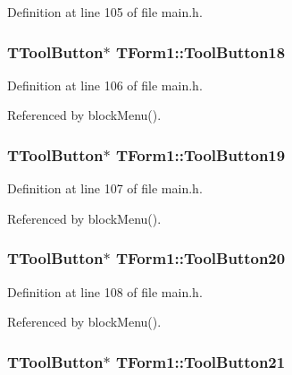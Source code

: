 Definition at line 105 of file main.h.\hypertarget{classTForm1_6459f873cefb4680462772e31df931c4}{
\subsubsection[ToolButton18]{\setlength{\rightskip}{0pt plus 5cm}TToolButton$\ast$ {\bf TForm1::ToolButton18}}}
\label{classTForm1_6459f873cefb4680462772e31df931c4}




Definition at line 106 of file main.h.

Referenced by blockMenu().\hypertarget{classTForm1_88347ab66f85c36c884738d8ee5e58a3}{
\subsubsection[ToolButton19]{\setlength{\rightskip}{0pt plus 5cm}TToolButton$\ast$ {\bf TForm1::ToolButton19}}}
\label{classTForm1_88347ab66f85c36c884738d8ee5e58a3}




Definition at line 107 of file main.h.

Referenced by blockMenu().\hypertarget{classTForm1_632d7a7fb1f58ef1eaa7f06813c1eb3d}{
\subsubsection[ToolButton20]{\setlength{\rightskip}{0pt plus 5cm}TToolButton$\ast$ {\bf TForm1::ToolButton20}}}
\label{classTForm1_632d7a7fb1f58ef1eaa7f06813c1eb3d}




Definition at line 108 of file main.h.

Referenced by blockMenu().\hypertarget{classTForm1_14ccc6f80b7fb70f80552b772075bcd9}{
\subsubsection[ToolButton21]{\setlength{\rightskip}{0pt plus 5cm}TToolButton$\ast$ {\bf TForm1::ToolButton21}}}
\label{classTForm1_14ccc6f80b7fb70f80552b772075bcd9}




